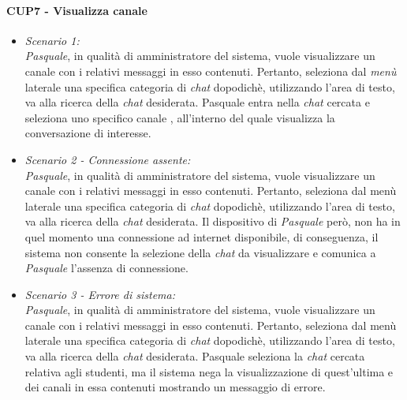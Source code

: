 \paragraph{CUP7 - Visualizza canale\\}
\begin{itemize}
	\item \textit{Scenario 1:\\}
	\textit{Pasquale}, in qualità di amministratore del sistema, vuole visualizzare un canale 
	con i relativi messaggi in esso contenuti. Pertanto, seleziona dal \textit{menù} laterale una specifica categoria di \textit{chat} dopodichè, utilizzando l'area di testo, va alla ricerca della \textit{chat} desiderata. Pasquale entra nella \textit{chat} cercata e seleziona uno specifico canale , all’interno del quale visualizza la conversazione di interesse.\\
	
	\item \textit{Scenario 2 - Connessione assente:\\}
	\textit{Pasquale}, in qualità di amministratore del sistema, vuole visualizzare un canale 
	con i relativi messaggi in esso contenuti. Pertanto, seleziona dal menù laterale una specifica categoria di \textit{chat} dopodichè, utilizzando l'area di testo, va alla ricerca della \textit{chat} desiderata. Il dispositivo di \textit{Pasquale} però, non ha in quel momento una connessione ad internet disponibile, di conseguenza, il sistema non consente la selezione della \textit{chat} da visualizzare e comunica a \textit{Pasquale} l’assenza di connessione.\\
	
	\item \textit{Scenario 3 - Errore di sistema:\\}
	\textit{Pasquale}, in qualità di amministratore del sistema, vuole visualizzare un canale 
	con i relativi messaggi in esso contenuti. Pertanto, seleziona dal menù laterale una specifica categoria di \textit{chat} dopodichè, utilizzando l'area di testo, va alla ricerca della \textit{chat} desiderata. Pasquale seleziona la \textit{chat} cercata relativa agli studenti, ma il sistema nega la visualizzazione di quest’ultima e dei canali in essa contenuti mostrando un messaggio di errore.\\
	
\end{itemize}

